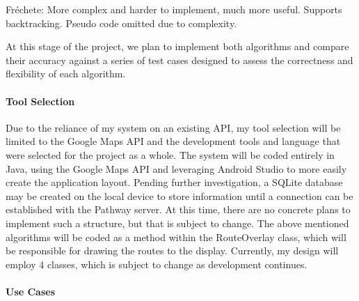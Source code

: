 ﻿\documentclass{article}
\begin{document}
Fréchete: More complex and harder to implement, much more useful. Supports backtracking. Pseudo code omitted due to complexity.

At this stage of the project, we plan to implement both algorithms and compare their accuracy against a series of test cases designed to assess the correctness and flexibility of each algorithm.

\paragraph{Tool Selection}
Due to the reliance of my system on an existing API, my tool selection will be limited to the Google Maps API and the development tools and language that were selected for the project as a whole. The system will be coded entirely in Java, using the Google Maps API and leveraging Android Studio to more easily create the application layout. Pending further investigation, a SQLite database may be created on the local device to store information until a connection can be established with the Pathway server. At this time, there are no concrete plans to implement such a structure, but that is subject to change. The above mentioned algorithms will be coded as a method within the RouteOverlay class, which will be responsible for drawing the routes to the display. Currently, my design will employ 4 classes, which is subject to change as development continues. 

\paragraph{Use Cases}
\end{document}
